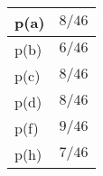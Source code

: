 \begin{tabular}{|l|l|}
\hline
p(a) & $8/46$ \\
\hline
p(b) & $6/46$ \\
\hline
p(c) & $8/46$ \\
\hline
p(d) & $8/46$ \\
\hline
p(f) & $9/46$ \\
\hline
p(h) & $7/46$ \\
\hline
\end{tabular}